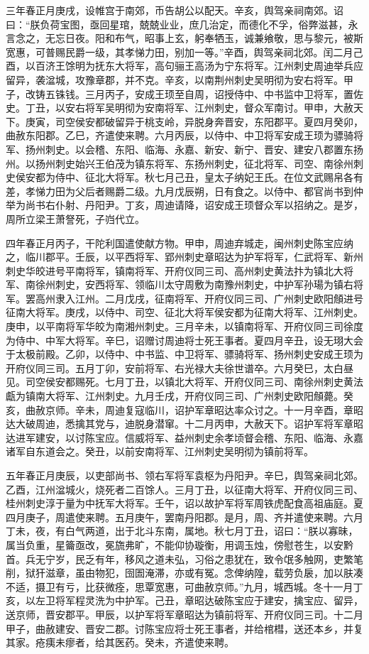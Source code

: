 \documentclass[]{article}
\begin{document}
三年春正月庚戌，设帷宫于南郊，币告胡公以配天。辛亥，舆驾亲祠南郊。诏曰：``朕负荷宝图，亟回星琯，兢兢业业，庶几治定，而德化不孚，俗弊滋甚，永言念之，无忘日夜。阳和布气，昭事上玄，躬奉牺玉，诚兼飨敬，思与黎元，被斯宽惠，可普赐民爵一级，其孝悌力田，别加一等。''辛酉，舆驾亲祠北郊。闰二月己酉，以百济王馀明为抚东大将军，高句骊王高汤为宁东将军。江州刺史周迪举兵应留异，袭湓城，攻豫章郡，并不克。辛亥，以南荆州刺史吴明彻为安右将军。甲子，改铸五铢钱。三月丙子，安成王顼至自周，诏授侍中、中书监中卫将军，置佐史。丁丑，以安右将军吴明彻为安南将军、江州刺史，督众军南讨。甲申，大赦天下。庚寅，司空侯安都破留异于桃支岭，异脱身奔晋安，东阳郡平。夏四月癸卯，曲赦东阳郡。乙巳，齐遣使来聘。六月丙辰，以侍中、中卫将军安成王顼为骠骑将军、扬州刺史。以会稽、东阳、临海、永嘉、新安、新宁、晋安、建安八郡置东扬州。以扬州刺史始兴王伯茂为镇东将军、东扬州刺史，征北将军、司空、南徐州刺史侯安都为侍中、征北大将军。秋七月己丑，皇太子纳妃王氏。在位文武赐帛各有差，孝悌力田为父后者赐爵二级。九月戊辰朔，日有食之。以侍中、都官尚书到仲举为尚书右仆射、丹阳尹。丁亥，周迪请降，诏安成王顼督众军以招纳之。是岁，周所立梁王萧詧死，子岿代立。

四年春正月丙子，干陀利国遣使献方物。甲申，周迪弃城走，闽州刺史陈宝应纳之，临川郡平。壬辰，以平西将军、郢州刺史章昭达为护军将军，仁武将军、新州刺史华皎进号平南将军，镇南将军、开府仪同三司、高州刺史黄法抃为镇北大将军、南徐州刺史，安西将军、领临川太守周敷为南豫州刺史，中护军孙瑒为镇右将军。罢高州隶入江州。二月戊戌，征南将军、开府仪同三司、广州刺史欧阳頠进号征南大将军。庚戌，以侍中、司空、征北大将军侯安都为征南大将军、江州刺史。庚申，以平南将军华皎为南湘州刺史。三月辛未，以镇南将军、开府仪同三司徐度为侍中、中军大将军。辛巳，诏赠讨周迪将士死王事者。夏四月辛丑，设无珝大会于太极前殿。乙卯，以侍中、中书监、中卫将军、骠骑将军、扬州刺史安成王顼为开府仪同三司。五月丁卯，安前将军、右光禄大夫徐世谱卒。六月癸巳，太白昼见。司空侯安都赐死。七月丁丑，以镇北大将军、开府仪同三司、南徐州刺史黄法甗为镇南大将军、江州刺史。九月壬戌，开府仪同三司、广州刺史欧阳頠薨。癸亥，曲赦京师。辛未，周迪复寇临川，诏护军章昭达率众讨之。十一月辛酉，章昭达大破周迪，悉擒其党与，迪脱身潜窜。十二月丙申，大赦天下。诏护军将军章昭达进军建安，以讨陈宝应。信威将军、益州刺史余孝顷督会稽、东阳、临海、永嘉诸军自东道会之。癸丑，以前安南将军、江州刺史吴明彻为镇前将军。

五年春正月庚辰，以吏部尚书、领右军将军袁枢为丹阳尹。辛巳，舆驾亲祠北郊。乙酉，江州湓城火，烧死者二百馀人。三月丁丑，以征南大将军、开府仪同三司、桂州刺史淳于量为中抚军大将军。壬午，诏以故护军将军周铁虎配食高祖庙庭。夏四月庚子，周遣使来聘。五月庚午，罢南丹阳郡。是月，周、齐并遣使来聘。六月丁未，夜，有白气两道，出于北斗东南，属地。秋七月丁丑，诏曰：``朕以寡昧，属当负重，星籥亟改，冕旒弗旷，不能仰协璇衡，用调玉烛，傍慰苍生，以安黔首。兵无宁岁，民乏有年，移风之道未弘，习俗之患犹在，致令氓多触网，吏繁笔削，狱犴滋章，虽由物犯，囹圄淹滞，亦或有冤。念俾纳隍，载劳负扆，加以肤凑不适，摄卫有亏，比获微痊，思覃宽惠，可曲赦京师。''九月，城西城。冬十一月丁亥，以左卫将军程灵洗为中护军。己丑，章昭达破陈宝应于建安，擒宝应、留异，送京师，晋安郡平。甲辰，以护军将军章昭达为镇前将军、开府仪同三司。十二月甲子，曲赦建安、晋安二郡。讨陈宝应将士死王事者，并给棺槥，送还本乡，并复其家。疮痍未瘳者，给其医药。癸未，齐遣使来聘。
\end{document}
